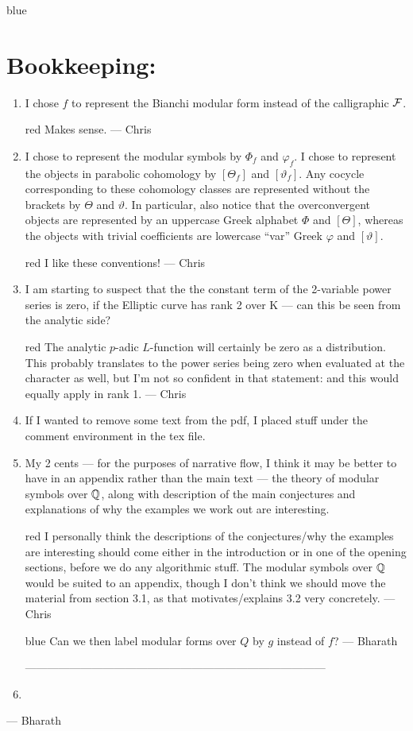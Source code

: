 \documentclass[a4paper,11pt]{article}
\newcommand{\CWnote}[1]{
 \begin{color}{red}
 \marginpar{$\spadesuit$} #1
  --- Chris
 \end{color}
}
\newcommand{\BP}[1]{
	\begin{color}{blue}
		\marginpar{$\heartsuit$} #1
		--- Bharath
	\end{color}
}
\newcommand{\CWnote}[1]{

}
\numberwithin{equation}{section}
\begin{document}
\BP{
\section*{Bookkeeping:}
\begin{enumerate}\item I chose $f$ to represent the Bianchi modular form instead of the calligraphic $\mathcal{F}$. \CWnote{Makes sense.}
\item I chose to represent the modular symbols by $\Phi_f$ and $\varphi_f$. I chose to represent the objects in parabolic cohomology by $[\Theta_f]$ and $[\vartheta_f]$. Any cocycle corresponding to these cohomology classes are represented without the brackets by $\Theta$ and $\vartheta$. In particular, also notice that the overconvergent objects are represented by an uppercase Greek alphabet $\Phi$ and $[\Theta]$, whereas the objects with trivial coefficients are lowercase ``var'' Greek $\varphi$ and $[\vartheta]$. \CWnote{I like these conventions!}
\item I am starting to suspect that the the constant term of the 2-variable power series is zero, if the Elliptic curve has rank 2 over K --- can this be seen from the analytic side? \CWnote{The analytic $p$-adic $L$-function will certainly be zero as a distribution. This probably translates to the power series being zero when evaluated at the character as well, but I'm not so confident in that statement: and this would equally apply in rank 1.}
\item If I wanted to remove some text from the pdf, I placed stuff under the comment environment in the tex file.
\item My 2 cents --- for the purposes of narrative flow, I think it may be better to have in an appendix rather than the main text --- the theory of modular symbols over $\mathbb{Q}$, along with description of the main conjectures and explanations of why the examples we work out are interesting. \CWnote{I personally think the descriptions of the conjectures/why the examples are interesting should come either in the introduction or in one of the opening sections, before we do any algorithmic stuff. The modular symbols over $\mathbb{Q}$ would be suited to an appendix, though I don't think we should move the material from section 3.1, as that motivates/explains 3.2 very concretely.}
\BP{Can we then label modular forms over $Q$ by $g$ instead of $f$?}

---------------------------------------------------------------------------------

\item


\end{enumerate}}
\end{document}
